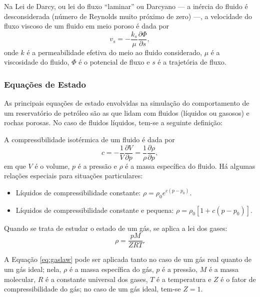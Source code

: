 \begin{theorem}
Na Lei de Darcy, ou lei do fluxo ``laminar'' ou Darcyano --- a in\'{e}rcia do fluido \'{e} desconsiderada (n\'{u}mero de Reynolds muito pr\'{o}ximo de zero) ---, a velocidade do fluxo viscoso de um fluido em meio poroso \'{e} dada por
\begin{equation}
	v_s = -\frac{k_s}{\mu} \frac{\partial\Phi}{\partial s},
\end{equation}
onde $k$ \'{e} a permeabilidade efetiva do meio ao fluido considerado, $\mu$ \'{e} a viscosidade do fluido, $\Phi$ \'{e} o potencial de fluxo e $s$ \'{e} a trajet\'{o}ria de fluxo.
\end{theorem}

\subsubsection{Equa\c{c}\~{o}es de Estado}
As principais equa\c{c}\~{o}es de estado envolvidas na simula\c{c}\~{a}o do comportamento de um reservat\'{o}rio de petr\'{o}leo s\~{a}o as que lidam com fluidos (l\'{i}quidos ou gasosos) e rochas porosas. No caso de fluidos l\'{i}quidos, tem-se a seguinte defini\c{c}\~{a}o:

\begin{definition}
A compressibilidade isot\'{e}rmica de um fluido \'{e} dada por
\begin{equation}
	c = -\frac{1}{V}\frac{\partial V}{\partial p} = \frac{1}{\rho}\frac{\partial \rho}{\partial p},
\end{equation}
em que $V$ \'{e} o volume, $p$ \'{e} a press\~{a}o e $\rho$ \'{e} a massa espec\'{i}fica do fluido. H\'{a} algumas rela\c{c}\~{o}es especiais para situa\c{c}\~{o}es particulares:
\begin{itemize}
\item L\'{i}quidos de compressibilidade constante: $\rho = \rho_0 e^{c(p-p_0)}$.
\item L\'{i}quidos de compressibilidade constante e pequena: $\rho = \rho_0 \left[1+c\left(p-p_0\right)\right]$.
\end{itemize}
\end{definition}

Quando se trata de estudar o estado de um g\'{a}s, se aplica a lei dos gases:
\begin{equation}\label{eq:gaslaw}
	\rho = \frac{pM}{ZRT}.
\end{equation}

A Equa\c{c}\~{a}o \eqref{eq:gaslaw} pode ser aplicada tanto no caso de um g\'{a}s real quanto de um g\'{a}s ideal; nela, $\rho$ \'{e} a massa espec\'{i}fica do g\'{a}s, $p$ \'{e} a press\~{a}o, $M$ \'{e} a massa molecular, $R$ \'{e} a constante universal dos gases, $T$ \'{e} a temperatura e $Z$ \'{e} o fator de compressibilidade do g\'{a}s; no caso de um g\'{a}s ideal, tem-se $Z = 1$.

